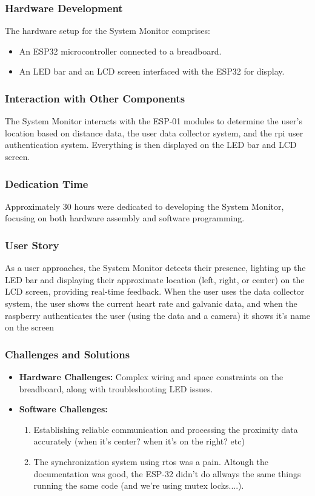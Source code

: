 \subsubsection{Hardware Development}
The hardware setup for the System Monitor comprises:
\begin{itemize}
    \item An ESP32 microcontroller connected to a breadboard.
    \item An LED bar and an LCD screen interfaced with the ESP32 for display.
\end{itemize}

\subsubsection{Interaction with Other Components}
The System Monitor interacts with the ESP-01 modules to determine the user's location based on distance data, the user data collector system, and the rpi user authentication system.  Everything is then displayed on the LED bar and LCD screen.

\subsubsection{Dedication Time}
Approximately 30 hours were dedicated to developing the System Monitor, focusing on both hardware assembly and software programming.

\subsubsection{User Story}
As a user approaches, the System Monitor detects their presence, lighting up the LED bar and displaying their approximate location (left, right, or center) on the LCD screen, providing real-time feedback.
When the user uses the data collector system, the user shows the current heart rate and galvanic data, and when the raspberry authenticates the user (using the data and a camera) it shows it's name on the screen

\subsubsection{Challenges and Solutions}
\begin{itemize}
    \item \textbf{Hardware Challenges:} Complex wiring and space constraints on the breadboard, along with troubleshooting LED issues.
    \item \textbf{Software Challenges:}
        \begin{enumerate}
            \item Establishing reliable communication and processing the proximity data accurately (when it's center? when it's on the right? etc)
            \item The synchronization system using rtos was a pain. Altough the documentation was good, the ESP-32 didn't do allways the same things running the same code (and we're using mutex locks....).
        \end{enumerate}
\end{itemize}

